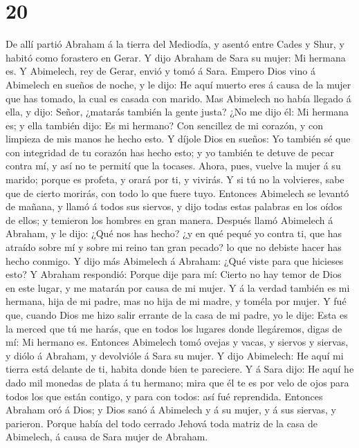\hypertarget{section-19}{%
\section{20}\label{section-19}}

 De allí partió Abraham á la tierra del Mediodía, y asentó
entre Cades y Shur, y habitó como forastero en Gerar.  Y
dijo Abraham de Sara su mujer: Mi hermana es. Y Abimelech, rey de Gerar,
envió y tomó á Sara.  Empero Dios vino á Abimelech en sueños
de noche, y le dijo: He aquí muerto eres á causa de la mujer que has
tomado, la cual es casada con marido.  Mas Abimelech no
había llegado á ella, y dijo: Señor, ¿matarás también la gente justa?
 ¿No me dijo él: Mi hermana es; y ella también dijo: Es mi
hermano? Con sencillez de mi corazón, y con limpieza de mis manos he
hecho esto.  Y díjole Dios en sueños: Yo también sé que con
integridad de tu corazón has hecho esto; y yo también te detuve de pecar
contra mí, y así no te permití que la tocases.  Ahora, pues,
vuelve la mujer á su marido; porque es profeta, y orará por ti, y
vivirás. Y si tú no la volvieres, sabe que de cierto morirás, con todo
lo que fuere tuyo.  Entonces Abimelech se levantó de mañana,
y llamó á todos sus siervos, y dijo todas estas palabras en los oídos de
ellos; y temieron los hombres en gran manera.  Después llamó
Abimelech á Abraham, y le dijo: ¿Qué nos has hecho? ¿y en qué pequé yo
contra ti, que has atraído sobre mí y sobre mi reino tan gran pecado? lo
que no debiste hacer has hecho conmigo.  Y dijo más
Abimelech á Abraham: ¿Qué viste para que hicieses esto?  Y
Abraham respondió: Porque dije para mí: Cierto no hay temor de Dios en
este lugar, y me matarán por causa de mi mujer.  Y á la
verdad también es mi hermana, hija de mi padre, mas no hija de mi madre,
y toméla por mujer.  Y fué que, cuando Dios me hizo salir
errante de la casa de mi padre, yo le dije: Esta es la merced que tú me
harás, que en todos los lugares donde llegáremos, digas de mí: Mi
hermano es.  Entonces Abimelech tomó ovejas y vacas, y
siervos y siervas, y diólo á Abraham, y devolvióle á Sara su mujer.
 Y dijo Abimelech: He aquí mi tierra está delante de ti,
habita donde bien te pareciere.  Y á Sara dijo: He aquí he
dado mil monedas de plata á tu hermano; mira que él te es por velo de
ojos para todos los que están contigo, y para con todos: así fué
reprendida.  Entonces Abraham oró á Dios; y Dios sanó á
Abimelech y á su mujer, y á sus siervas, y parieron. 
Porque había del todo cerrado Jehová toda matriz de la casa de
Abimelech, á causa de Sara mujer de Abraham.

